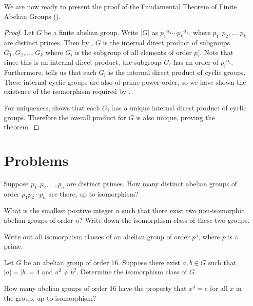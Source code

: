 We are now ready to present the proof of the Fundamental Theorem of Finite Abelian Groups ().
\begin{proof}
    Let $G$ be a finite abelian group. Write $|G|$ as ${p_1}^{\alpha_1}\cdots{p_k}^{\alpha_k}$, where $p_1, p_2, \dots, p_k$ are distinct primes. Then by , $G$ is the internal direct product of subgroups $G_1, G_2, \dots, G_k$ where $G_i$ is the subgroup of all elements of order $p_i^r$. Note that since this is an internal direct product, the subgroup $G_i$ has an order of ${p_i}^{\alpha_i}$. Furthermore,  tells us that each $G_i$ is the internal direct product of cyclic groups. These internal cyclic groups are also of prime-power order, so we have shown the existence of the isomorphism required by .

    For uniqueness,  shows that each $G_i$ has a unique internal direct product of cyclic groups. Therefore the overall product for $G$ is also unique, proving the theorem.
\end{proof}

\newpage

\section{Problems}
\begin{problem}
    Suppose $p_1, p_2, \dots, p_n$ are distinct primes. How many distinct abelian groups of order $p_1p_2\cdots p_n$ are there, up to isomorphism?
\end{problem}

\begin{problem}
    What is the smallest positive integer $n$ such that there exist two non-isomorphic abelian groups of order $n$? Write down the isomorphism class of these two groups.
\end{problem}

\begin{problem}
    Write out all isomorphism classes of an abelian group of order $p^4$, where $p$ is a prime.
\end{problem}

\begin{problem}
    Let $G$ be an abelian group of order 16. Suppose there exist $a, b \in G$ such that $|a| = |b| = 4$ and $a^2 \neq b^2$. Determine the isomorphism class of $G$.
\end{problem}

\begin{problem}
    How many abelian groups of order 16 have the property that $x^4 = e$ for all $x$ in the group, up to isomorphism?
\end{problem}
